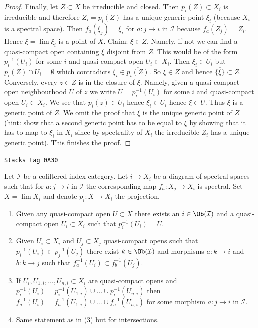 \begin{proof}
\medskip\noindent
Finally, let $Z \subset X$ be irreducible and closed. Then $p_i(Z) \subset X_i$
is irreducible and therefore $Z_i = \overline{p_i(Z)}$ has a unique generic
point $\xi_i$ (because $X_i$ is a spectral space). Then $f_a(\xi_j) = \xi_i$
for $a : j \to i$ in $\mathcal{I}$ because $\overline{f_a(Z_j)} = Z_i$.
Hence $\xi = \lim \xi_i$ is a point of $X$. Claim: $\xi \in Z$. Namely,
if not we can find a quasi-compact open containing $\xi$ disjoint
from $Z$. This would be of the form $p_i^{-1}(U_i)$ for some $i$ and
quasi-compact open $U_i \subset X_i$. Then $\xi_i \in U_i$ but
$p_i(Z) \cap U_i = \emptyset$ which contradicts $\xi_i \in \overline{p_i(Z)}$.
So $\xi \in Z$ and hence $\overline{\{\xi\}} \subset Z$. Conversely,
every $z \in Z$ is in the closure of $\xi$. Namely, given a quasi-compact
open neighbourhood $U$ of $z$ we write $U = p_i^{-1}(U_i)$ for some $i$
and quasi-compact open $U_i \subset X_i$. We see that $p_i(z) \in U_i$
hence $\xi_i \in U_i$ hence $\xi \in U$. Thus $\xi$ is a generic point
of $Z$. We omit the proof that $\xi$ is the unique generic point of $Z$
(hint: show that a second generic point has to be equal to $\xi$
by showing that it has to map to $\xi_i$ in $X_i$ since
by spectrality of $X_i$ the irreducible $Z_i$ has a unique generic point).
This finishes the proof.
\end{proof}

\begin{lemma}
\label{topology-lemma-descend-opens}
\href{https://stacks.math.columbia.edu/tag/0A30}{\texttt{Stacks tag 0A30}}

Let $\mathcal{I}$ be a cofiltered index category.
Let $i \mapsto X_i$ be a diagram of spectral spaces such
that for $a : j \to i$ in $\mathcal{I}$ the corresponding map
$f_a : X_j \to X_i$ is spectral. Set $X = \lim X_i$ and denote
$p_i : X \to X_i$ the projection.
\begin{enumerate}
\item Given any quasi-compact open $U \subset X$
there exists an $i \in \Ob(\mathcal{I})$ and a quasi-compact open
$U_i \subset X_i$ such that $p_i^{-1}(U_i) = U$.
\item Given $U_i \subset X_i$ and $U_j \subset X_j$
quasi-compact opens such that $p_i^{-1}(U_i) \subset p_j^{-1}(U_j)$
there exist $k \in \Ob(\mathcal{I})$ and morphisms
$a : k \to i$ and $b : k \to j$ such that $f_a^{-1}(U_i) \subset f_b^{-1}(U_j)$.
\item If $U_i, U_{1, i}, \ldots, U_{n, i} \subset X_i$ are quasi-compact
opens and
$p_i^{-1}(U_i) = p_i^{-1}(U_{1, i}) \cup \ldots \cup p_i^{-1}(U_{n, i})$
then
$f_a^{-1}(U_i) = f_a^{-1}(U_{1, i}) \cup \ldots \cup f_a^{-1}(U_{n, i})$
for some morphism $a : j \to i$ in $\mathcal{I}$.
\item Same statement as in (3) but for intersections.
\end{enumerate}
\end{lemma}

